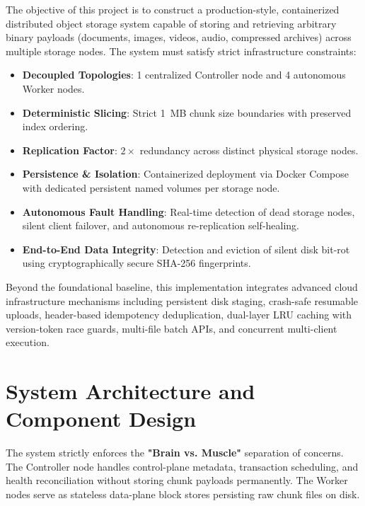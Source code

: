 \documentclass[11pt,a4paper]{article}
\begin{document}
The objective of this project is to construct a production-style, containerized distributed object storage system capable of storing and retrieving arbitrary binary payloads (documents, images, videos, audio, compressed archives) across multiple storage nodes. The system must satisfy strict infrastructure constraints:
\begin{itemize}[noitemsep]
    \item \textbf{Decoupled Topologies}: 1 centralized Controller node and 4 autonomous Worker nodes.
    \item \textbf{Deterministic Slicing}: Strict 1~MB chunk size boundaries with preserved index ordering.
    \item \textbf{Replication Factor}: $2\times$ redundancy across distinct physical storage nodes.
    \item \textbf{Persistence \& Isolation}: Containerized deployment via Docker Compose with dedicated persistent named volumes per storage node.
    \item \textbf{Autonomous Fault Handling}: Real-time detection of dead storage nodes, silent client failover, and autonomous re-replication self-healing.
    \item \textbf{End-to-End Data Integrity}: Detection and eviction of silent disk bit-rot using cryptographically secure SHA-256 fingerprints.
\end{itemize}

Beyond the foundational baseline, this implementation integrates advanced cloud infrastructure mechanisms including persistent disk staging, crash-safe resumable uploads, header-based idempotency deduplication, dual-layer LRU caching with version-token race guards, multi-file batch APIs, and concurrent multi-client execution.

\section{System Architecture and Component Design}
\label{sec:arch}

The system strictly enforces the \textbf{"Brain vs. Muscle"} separation of concerns. The Controller node handles control-plane metadata, transaction scheduling, and health reconciliation without storing chunk payloads permanently. The Worker nodes serve as stateless data-plane block stores persisting raw chunk files on disk.
\end{document}
